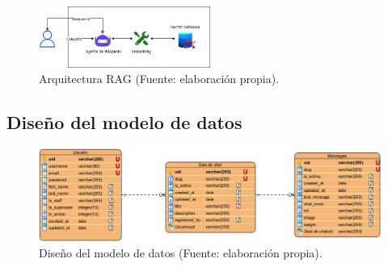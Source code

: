 \begin{figure}[htbp] 
	\centering
	\includegraphics[width=0.5\textwidth]{images/RAGArchitect.png} 
	\caption{Arquitectura RAG (Fuente: elaboración propia).}
	\label{fig:rag}
\end{figure}

\subsection{Diseño del modelo de datos}

\begin{figure}[htbp] 
	\centering
	\includegraphics[width=1\textwidth]{images/modelo.png} 
	\caption{Diseño del modelo de datos (Fuente: elaboración propia).}
	\label{fig:modelo_de_datos}
\end{figure}


